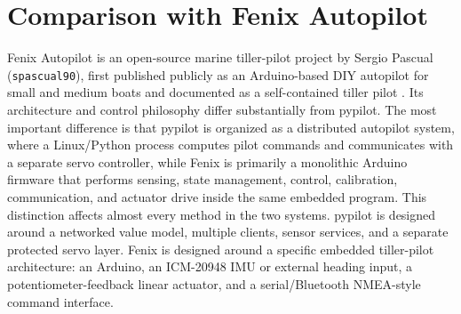 \documentclass[10pt,twocolumn]{article}
\begin{document}
\section{Comparison with Fenix Autopilot}
\label{sec:fenix-comparison}
Fenix Autopilot is an open-source marine tiller-pilot project by Sergio Pascual
(\texttt{spascual90}), first published publicly as an Arduino-based DIY autopilot for
small and medium boats and documented as a self-contained tiller pilot
\cite{fenix-repo,fenix-overview}.  Its architecture and control philosophy differ
substantially from pypilot.  The most important
difference is that pypilot is organized as a distributed autopilot system,
where a Linux/Python process computes pilot commands and communicates with
a separate servo controller, while Fenix is primarily a monolithic Arduino
firmware that performs sensing, state management, control, calibration,
communication, and actuator drive inside the same embedded program.
This distinction affects almost every method in the two systems.  pypilot
is designed around a networked value model, multiple clients, sensor
services, and a separate protected servo layer.  Fenix is designed around a
specific embedded tiller-pilot architecture: an Arduino, an ICM-20948 IMU
or external heading input, a potentiometer-feedback linear actuator, and a
serial/Bluetooth NMEA-style command interface.
\end{document}
